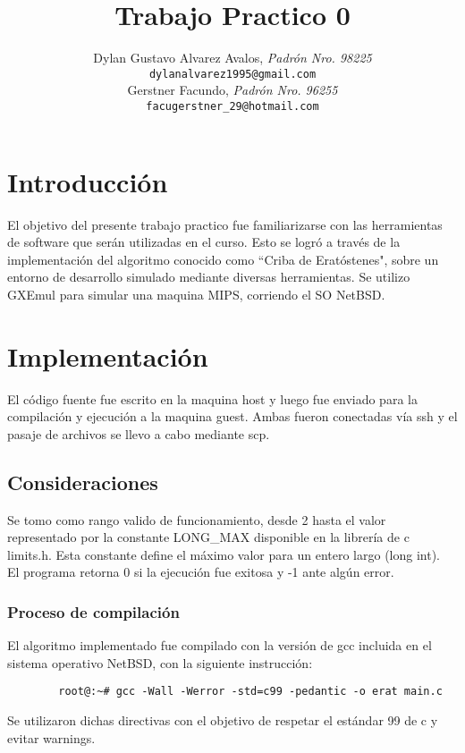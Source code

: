 \documentclass[a4paper,10pt]{article}
\begin{document}
\title{\textbf{Trabajo Practico 0}}

\author{	Dylan Gustavo Alvarez Avalos, \textit{Padrón Nro. 98225}                     \\
            \texttt{ dylanalvarez1995@gmail.com }                                              \\
            Gerstner Facundo, \textit{Padrón Nro. 96255}                     \\
            \texttt{ facugerstner_29@hotmail.com }                                              \\
       }
\date{}

\thispagestyle{empty}


\section{Introducción}
  
   El objetivo del presente trabajo practico fue familiarizarse con las herramientas de software que serán utilizadas en el curso. Esto se logró 
   a través de la implementación del algoritmo conocido como ``Criba de Eratóstenes", sobre un entorno de desarrollo simulado 
   mediante diversas herramientas. Se utilizo GXEmul para simular una maquina MIPS, corriendo el SO NetBSD.


\section{Implementación}
    El código fuente fue escrito en la maquina host y luego fue enviado para la compilación y ejecución a la maquina guest. Ambas fueron conectadas vía ssh y el pasaje de archivos se llevo a cabo mediante scp.

    \subsection{Consideraciones}
        Se tomo como rango valido de funcionamiento, desde 2 hasta el valor representado por la constante LONG\_MAX disponible en la librería de c limits.h. Esta constante define el máximo valor para un entero largo (long int).\\
        El programa retorna 0 si la ejecución fue exitosa y -1 ante algún error.
    \subsubsection{Proceso de compilación}
        El algoritmo implementado fue compilado con la versión de gcc incluida en el sistema operativo NetBSD, con la siguiente instrucción:\\
    \begin{verbatim}
        root@:~# gcc -Wall -Werror -std=c99 -pedantic -o erat main.c
    \end{verbatim}
    Se utilizaron dichas directivas con el objetivo de respetar el estándar 99 de c y evitar warnings. 
\end{document}
